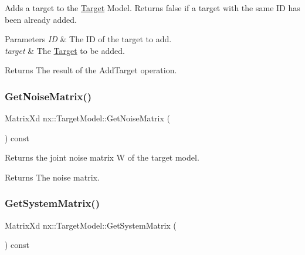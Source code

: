 Adds a target to the \hyperlink{structnx_1_1Target}{Target} Model. Returns false if a target with the same ID has been already added. 
\begin{DoxyParams}{Parameters}
{\em ID} & The ID of the target to add. \\
\hline
{\em target} & The \hyperlink{structnx_1_1Target}{Target} to be added. \\
\hline
\end{DoxyParams}
\begin{DoxyReturn}{Returns}
The result of the Add\+Target operation. 
\end{DoxyReturn}
\mbox{\label{classnx_1_1TargetModel_a8b4c0bf53662bfedb955754f8debc674}} 
\subsubsection{\texorpdfstring{Get\+Noise\+Matrix()}{GetNoiseMatrix()}}
{\footnotesize\ttfamily Matrix\+Xd nx\+::\+Target\+Model\+::\+Get\+Noise\+Matrix (\begin{DoxyParamCaption}{ }\end{DoxyParamCaption}) const\hspace{0.3cm}{\ttfamily [inline]}}

Returns the joint noise matrix W of the target model. \begin{DoxyReturn}{Returns}
The noise matrix. 
\end{DoxyReturn}
\mbox{\label{classnx_1_1TargetModel_a1ee2990a96918171f0f779afed6d9f53}} 
\subsubsection{\texorpdfstring{Get\+System\+Matrix()}{GetSystemMatrix()}}
{\footnotesize\ttfamily Matrix\+Xd nx\+::\+Target\+Model\+::\+Get\+System\+Matrix (\begin{DoxyParamCaption}{ }\end{DoxyParamCaption}) const\hspace{0.3cm}{\ttfamily [inline]}}

